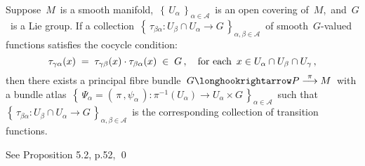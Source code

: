 
\vskip 0.5cm
\begin{proposition}
\label{cocycleDeterminesPFB}
\mbox{}
\vskip 0.2cm
\noindent
Suppose \,$M$\, is a smooth manifold,
\,$\left\{\,U_{\alpha}\,\right\}_{\alpha\in\mathcal{A}}$\,
is an open covering of \,$M$,\, and
\,$G$\, is a Lie group.
If a collection
\,$\left\{\,\tau_{\beta\alpha} : U_{\beta} \cap U_{\alpha} \longrightarrow G\,\right\}_{\alpha,\beta\in\mathcal{A}}$\,
of smooth \,$G$-valued functions
satisfies the cocycle condition:
\begin{equation*}
\tau_{\gamma\alpha}(x) \; = \; \tau_{\gamma\beta}(x) \cdot \tau_{\beta\alpha}(x) \; \in \; G\,,
\quad
\textnormal{for each \,$x \in U_{\alpha} \cap U_{\beta} \cap U_{\gamma}$}\,,
\end{equation*}
then there exists a principal fibre bundle
\,$G \longhookrightarrow P \overset{\pi}{\longrightarrow} M$\,
with a bundle atlas
\,$\left\{\,\Psi_{\alpha} = (\,\pi\,,\psi_{\alpha}\,) : \pi^{-1}(U_{\alpha}) \longrightarrow U_{\alpha} \times G\,\right\}_{\alpha\in\mathcal{A}}$\,
such that
\,$\left\{\,\tau_{\beta\alpha} : U_{\beta} \cap U_{\alpha} \longrightarrow G\,\right\}_{\alpha,\beta\in\mathcal{A}}$\,
is the corresponding collection of transition functions.
\end{proposition}
\proof
See Proposition 5.2, p.52, \cite{Kobayashi1963v1}
\qed


